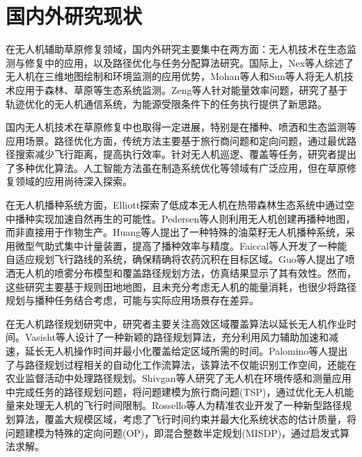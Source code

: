 \documentclass[AutoFakeBold]{LZUThesis}
\begin{document}
\section{国内外研究现状}

在无人机辅助草原修复领域，国内外研究主要集中在两方面：无人机技术在生态监测与修复中的应用，以及路径优化与任务分配算法研究。国际上，Nex等人\cite{nex2014uav}综述了无人机在三维地图绘制和环境监测的应用优势，Mohan等人\cite{mohan2021uav}和Sun等人\cite{sun2018unmanned}将无人机技术应用于森林、草原等生态系统监测。Zeng等人\cite{zeng2017energy}针对能量效率问题，研究了基于轨迹优化的无人机通信系统，为能源受限条件下的任务执行提供了新思路。

国内无人机技术在草原修复中也取得一定进展，特别是在播种、喷洒\cite{faiccal2017adaptive}和生态监测等应用场景。路径优化方面，传统方法主要基于旅行商问题和定向问题\cite{shivgan2020energy}，通过最优路径搜索减少飞行距离，提高执行效率。针对无人机巡逻、覆盖等任务，研究者提出了多种优化算法\cite{rajan2022routing,yang2015path,guo2021spraying}。人工智能方法虽在制造系统优化等领域有广泛应用\cite{renzi2014review}，但在草原修复领域的应用尚待深入探索。

在无人机播种系统方面，Elliott\cite{elliott2016potential}探索了低成本无人机在热带森林生态系统中通过空中播种实现加速自然再生的可能性。Pedersen等人\cite{pedersen2017robotic}则利用无人机创建再播种地图，而非直接用于作物生产。Huang等人\cite{huang2020design}提出了一种特殊的油菜籽无人机播种系统，采用微型气助式集中计量装置，提高了播种效率与精度。Faiccal等人\cite{faiccal2017adaptive}开发了一种能自适应规划飞行路线的系统，确保精确将农药沉积在目标区域。Guo等人\cite{guo2021spraying}提出了喷洒无人机的喷雾分布模型和覆盖路径规划方法，仿真结果显示了其有效性。然而，这些研究主要基于规则田地地图，且未充分考虑无人机的能量消耗，也很少将路径规划与播种任务结合考虑，可能与实际应用场景存在差异。

在无人机路径规划研究中，研究者主要关注高效区域覆盖算法以延长无人机作业时间。Vasisht等人\cite{vasisht2017farmbeats}设计了一种新颖的路径规划算法，充分利用风力辅助加速和减速，延长无人机操作时间并最小化覆盖给定区域所需的时间。Palomino等人\cite{palomino2019towards}提出了与路径规划过程相关的自动化工作流算法，该算法不仅能识别工作空间，还能在农业监督活动中处理路径规划。Shivgan等人\cite{shivgan2020energy}研究了无人机在环境传感和测量应用中完成任务的路径规划问题，将问题建模为旅行商问题(TSP)，通过优化无人机能量来处理无人机的飞行时间限制。Rossello等人\cite{rossello2021information}为精准农业开发了一种新型路径规划算法，覆盖大规模区域，考虑了飞行时间约束并最大化系统状态的估计质量，将问题建模为特殊的定向问题(OP)，即混合整数半定规划(MISDP)，通过启发式算法求解。
\end{document}

